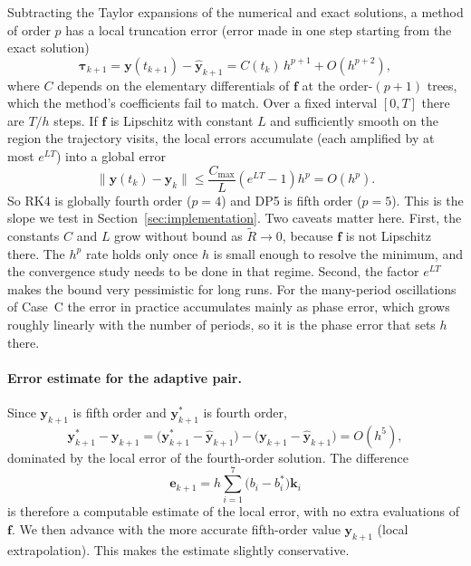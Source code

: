 Subtracting the Taylor expansions of the numerical and exact solutions, a method of order $p$ has a local truncation error (error made in one step starting from the exact solution)
\begin{equation}
\boldsymbol{\tau}_{k+1}=\mathbf{y}(t_{k+1})-\hat{\mathbf{y}}_{k+1}=C(t_k)\,h^{p+1}+O(h^{p+2}),
\end{equation}
where $C$ depends on the elementary differentials of $\mathbf{f}$ at the order-$(p+1)$ trees, which the method's coefficients fail to match. Over a fixed interval $[0,T]$ there are $T/h$ steps. If $\mathbf{f}$ is Lipschitz with constant $L$ and sufficiently smooth on the region the trajectory visits, the local errors accumulate (each amplified by at most $e^{LT}$) into a global error
\begin{equation}
\|\mathbf{y}(t_k)-\mathbf{y}_k\|\le \frac{C_{\max}}{L}\left(e^{LT}-1\right)h^{p}=O(h^{p}) .
\end{equation}
So RK4 is globally fourth order ($p=4$) and DP5 is fifth order ($p=5$). This is the slope we test in Section~\ref{sec:implementation}. Two caveats matter here. First, the constants $C$ and $L$ grow without bound as $\tilde R\to0$, because $\mathbf{f}$ is not Lipschitz there. The $h^p$ rate holds only once $h$ is small enough to resolve the minimum, and the convergence study needs to be done in that regime. Second, the factor $e^{LT}$ makes the bound very pessimistic for long runs. For the many-period oscillations of Case~C the error in practice accumulates mainly as phase error, which grows roughly linearly with the number of periods, so it is the phase error that sets $h$ there.

\paragraph{Error estimate for the adaptive pair.} Since $\mathbf{y}_{k+1}$ is fifth order and $\mathbf{y}^{*}_{k+1}$ is fourth order,
\begin{equation}
\mathbf{y}^{*}_{k+1}-\mathbf{y}_{k+1}=\big(\mathbf{y}^{*}_{k+1}-\hat{\mathbf{y}}_{k+1}\big)-\big(\mathbf{y}_{k+1}-\hat{\mathbf{y}}_{k+1}\big)=O(h^{5}),
\end{equation}
dominated by the local error of the fourth-order solution. The difference
\begin{equation}
\mathbf{e}_{k+1}=h\sum_{i=1}^{7}\big(b_i-b_i^{*}\big)\mathbf{k}_i
\end{equation}
is therefore a computable estimate of the local error, with no extra evaluations of $\mathbf{f}$. We then advance with the more accurate fifth-order value $\mathbf{y}_{k+1}$ (local extrapolation). This makes the estimate slightly conservative.


